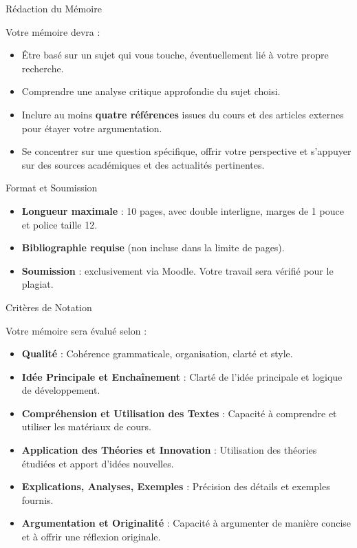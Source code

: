 \documentclass[
  letterpaper,
  DIV=11,
  numbers=noendperiod]{scrreprt}
\providecommand{\tightlist}{%
  \setlength{\itemsep}{0pt}\setlength{\parskip}{0pt}}\usepackage{longtable,booktabs,array}
\begin{document}
Rédaction du Mémoire

Votre mémoire devra :

\begin{itemize}
\tightlist
\item
  Être basé sur un sujet qui vous touche, éventuellement lié à votre
  propre recherche.\\
\item
  Comprendre une analyse critique approfondie du sujet choisi.\\
\item
  Inclure au moins \textbf{quatre références} issues du cours et des
  articles externes pour étayer votre argumentation.\\
\item
  Se concentrer sur une question spécifique, offrir votre perspective et
  s'appuyer sur des sources académiques et des actualités pertinentes.
\end{itemize}

Format et Soumission

\begin{itemize}
\tightlist
\item
  \textbf{Longueur maximale} : 10 pages, avec double interligne, marges
  de 1 pouce et police taille 12.\\
\item
  \textbf{Bibliographie requise} (non incluse dans la limite de
  pages).\\
\item
  \textbf{Soumission} : exclusivement via Moodle. Votre travail sera
  vérifié pour le plagiat.
\end{itemize}

Critères de Notation

Votre mémoire sera évalué selon :

\begin{itemize}
\tightlist
\item
  \textbf{Qualité} : Cohérence grammaticale, organisation, clarté et
  style.\\
\item
  \textbf{Idée Principale et Enchaînement} : Clarté de l'idée principale
  et logique de développement.\\
\item
  \textbf{Compréhension et Utilisation des Textes} : Capacité à
  comprendre et utiliser les matériaux de cours.\\
\item
  \textbf{Application des Théories et Innovation} : Utilisation des
  théories étudiées et apport d'idées nouvelles.\\
\item
  \textbf{Explications, Analyses, Exemples} : Précision des détails et
  exemples fournis.\\
\item
  \textbf{Argumentation et Originalité} : Capacité à argumenter de
  manière concise et à offrir une réflexion originale.
\end{itemize}
\end{document}

